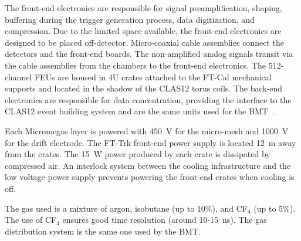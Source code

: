 The front-end electronics are responsible for signal preamplification, shaping, buffering during the trigger generation
process, data digitization, and compression. Due to the limited space available, the front-end electronics are designed
to be placed off-detector. Micro-coaxial cable assemblies connect the detectors and the front-end boards. The
non-amplified analog signals transit via the cable assemblies from the chambers to the front-end electronics. The
512-channel FEUs are housed in 4U crates attached to the FT-Cal mechanical supports and  located in the shadow of
the CLAS12 torus coils. The back-end electronics are responsible for data concentration, providing the interface to
the CLAS12 event building system and are the same units used for the BMT~\cite{mm}.

Each Micromegas layer is powered with 450~V for the micro-mesh and 1000~V for the drift electrode. The FT-Trk
front-end power supply is located 12~m away from the crates. The 15~W power produced by each crate is dissipated by
compressed air. An interlock system between the cooling infrastructure and the low voltage power supply prevents
powering the front-end crates when cooling is off. 

The gas used is a mixture of argon, isobutane (up to 10\%), and CF$_4$ (up to 5\%). The use of CF$_4$ ensures 
good time resolution (around 10-15~ns). The gas distribution system is the same one used by the BMT.
